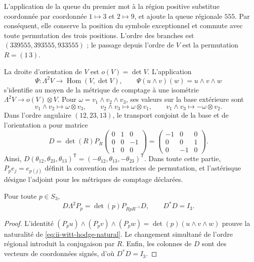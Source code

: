 L’application de la queue du premier mot à la région positive
substitue coordonnée par coordonnée \(1\mapsto3\) et \(2\mapsto9\), et ajoute
la queue régionale \(555\). Par conséquent, elle conserve la position du symbole
exceptionnel et commute avec toute permutation des trois positions. L’ordre
des branches est \((339555,393555,933555)\) ; le passage depuis l’ordre de
\(V\) est la permutation \(R=(1\,3)\).

La droite d’orientation de \(V\) est \(o(V)=\det V\). L’application
\begin{equation}
 \Psi:\Lambda^2V\longrightarrow\operatorname{Hom}(V,\det V),
 \qquad \Psi(u\wedge v)(w)=u\wedge v\wedge w
 \label{eq:ii-witt-hodge-natural}
\end{equation}
s’identifie au moyen de la métrique de comptage à une isométrie
\(\Lambda^2V\to o(V)\otimes V\). Pour
\(\omega=v_1\wedge v_2\wedge v_3\), ses valeurs sur la base extérieure
sont
\[
 v_1\wedge v_2\mapsto\omega\otimes v_3,
 \qquad v_2\wedge v_3\mapsto\omega\otimes v_1,
 \qquad v_1\wedge v_3\mapsto-\omega\otimes v_2.
\]
Dans l’ordre angulaire \((12,23,13)\), le transport conjoint de la base et de
l’orientation a pour matrice
\begin{equation}
 D=\det(R)P_R
 \begin{pmatrix}0&1&0\\0&0&-1\\1&0&0\end{pmatrix}
 =\begin{pmatrix}-1&0&0\\0&0&1\\0&-1&0\end{pmatrix}.
 \label{eq:ii-witt-orientation-D}
\end{equation}
Ainsi,
\(D(\theta_{12},\theta_{23},\theta_{13})^{\mathsf T}
=(-\theta_{12},\theta_{13},-\theta_{23})^{\mathsf T}\).
Dans toute cette partie, \(P_p e_j=e_{p(j)}\) définit la convention des
matrices de permutation, et l’astérisque désigne l’adjoint pour les métriques
de comptage déclarées.

\begin{proposition}
\label{prop:ii-witt-D-natural}
Pour toute \(p\in S_3\),
\[
 D\Lambda^2P_p=\det(p)P_{RpR^{-1}}D,
 \qquad D^*D=I_3.
\]
\end{proposition}
\begin{proof}
L’identité
\((P_pu)\wedge(P_pv)\wedge(P_pw)=\det(p)(u\wedge v\wedge w)\)
prouve la naturalité de \eqref{eq:ii-witt-hodge-natural}. Le changement
simultané de l’ordre régional introduit la conjugaison par \(R\).
Enfin, les colonnes de \(D\) sont des vecteurs de coordonnées signés,
d’où \(D^*D=I_3\).
\end{proof}

